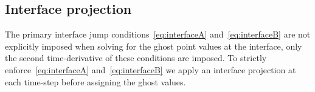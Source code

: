 %
%
\newcommand{\Kc}{\mathcal{K}}
\newcommand{\dc}{\Kc}%
\newcommand{\lr}{m}%
\newcommand{\charv}{\psi}%
\subsection{Interface projection}


The primary interface jump conditions~\eqref{eq:interfaceA} and~\eqref{eq:interfaceB}
are not explicitly imposed when solving for the ghost point values at the interface, only
the second time-derivative of these conditions are imposed. To strictly enforce~\eqref{eq:interfaceA} and~\eqref{eq:interfaceB}
we apply an interface projection at each time-step before assigning the ghost values.



